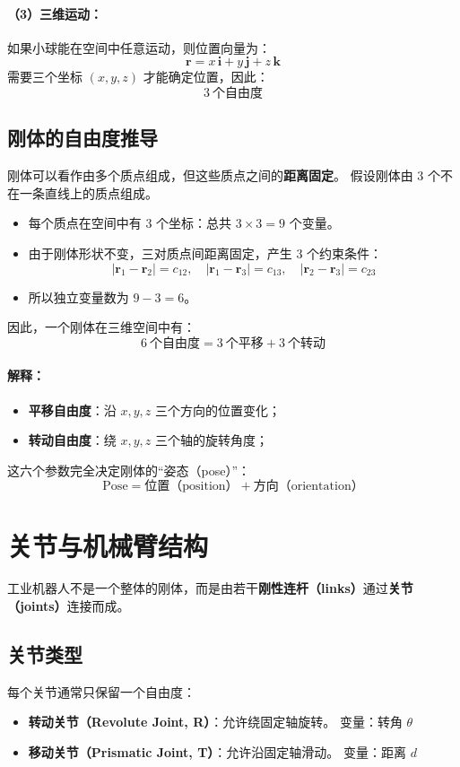 \documentclass[12pt,a4paper]{article}
\begin{document}
\paragraph{（3）三维运动：}
如果小球能在空间中任意运动，则位置向量为：
\[
\boldsymbol{r} = x\,\boldsymbol{i} + y\,\boldsymbol{j} + z\,\boldsymbol{k}
\]
需要三个坐标 \((x,y,z)\) 才能确定位置，因此：
\[
\boxed{3\ \text{个自由度}}
\]

\subsection{刚体的自由度推导}
刚体可以看作由多个质点组成，但这些质点之间的\textbf{距离固定}。  
假设刚体由 3 个不在一条直线上的质点组成。

\begin{itemize}
  \item 每个质点在空间中有 3 个坐标：总共 \(3\times3 = 9\) 个变量。
  \item 由于刚体形状不变，三对质点间距离固定，产生 3 个约束条件：
  \[
  |\boldsymbol{r}_1 - \boldsymbol{r}_2| = c_{12}, \quad
  |\boldsymbol{r}_1 - \boldsymbol{r}_3| = c_{13}, \quad
  |\boldsymbol{r}_2 - \boldsymbol{r}_3| = c_{23}
  \]
  \item 所以独立变量数为 \(9 - 3 = 6\)。
\end{itemize}

\noindent
因此，一个刚体在三维空间中有：
\[
\boxed{6\ \text{个自由度} = 3\ \text{个平移} + 3\ \text{个转动}}
\]

\paragraph{解释：}
\begin{itemize}
  \item \textbf{平移自由度}：沿 $x, y, z$ 三个方向的位置变化；
  \item \textbf{转动自由度}：绕 $x, y, z$ 三个轴的旋转角度；
\end{itemize}
这六个参数完全决定刚体的“姿态（pose）”：
\[
\text{Pose} = \text{位置（position）} + \text{方向（orientation）}
\]

\section{关节与机械臂结构}
工业机器人不是一个整体的刚体，而是由若干\textbf{刚性连杆（links）}通过\textbf{关节（joints）}连接而成。

\subsection{关节类型}
每个关节通常只保留一个自由度：
\begin{itemize}
  \item \textbf{转动关节（Revolute Joint, R）}：允许绕固定轴旋转。  
    变量：转角 \(\theta\)
  \item \textbf{移动关节（Prismatic Joint, T）}：允许沿固定轴滑动。  
    变量：距离 \(d\)
\end{itemize}
\end{document}
